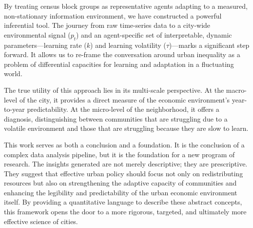 \documentclass{article}
\begin{document}
By treating census block groups as representative agents adapting to a measured, non-stationary information environment, we have constructed a powerful inferential tool. The journey from raw time-series data to a city-wide environmental signal ($p_t$) and an agent-specific set of interpretable, dynamic parameters---learning rate ($k$) and learning volatility ($\tau$)---marks a significant step forward. It allows us to re-frame the conversation around urban inequality as a problem of differential capacities for learning and adaptation in a fluctuating world.

The true utility of this approach lies in its multi-scale perspective. At the macro-level of the city, it provides a direct measure of the economic environment's year-to-year predictability. At the micro-level of the neighborhood, it offers a diagnosis, distinguishing between communities that are struggling due to a volatile environment and those that are struggling because they are slow to learn.

This work serves as both a conclusion and a foundation. It is the conclusion of a complex data analysis pipeline, but it is the foundation for a new program of research. The insights generated are not merely descriptive; they are prescriptive. They suggest that effective urban policy should focus not only on redistributing resources but also on strengthening the adaptive capacity of communities and enhancing the legibility and predictability of the urban economic environment itself. By providing a quantitative language to describe these abstract concepts, this framework opens the door to a more rigorous, targeted, and ultimately more effective science of cities.
\end{document}
